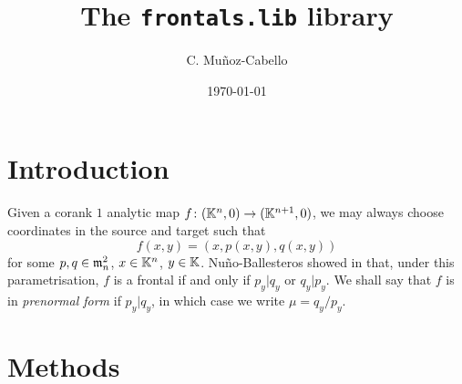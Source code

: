 \documentclass[
]{kaohandt}
\begin{document}

\title[The \texttt{frontals.lib} library]{The \texttt{frontals.lib} library}

\author[CMC]{C. Muñoz-Cabello}

\date{\today}


\maketitle

\margintoc

\begin{abstract}
\noindent
\end{abstract}


\medskip


\section{Introduction}

Given a corank $1$ analytic map $f\colon (\mathbb{K}^n,0) \to (\mathbb{K}^{n+1},0)$, we may always choose coordinates in the source and target such that
\begin{equation}\label{corank 1}
	f(x,y)=(x, p(x,y), q(x,y))
\end{equation}
for some $p,q \in \mathfrak{m}_n^2$, $x \in \mathbb{K}^n$, $y \in \mathbb{K}$.
Nuño-Ballesteros showed in  that, under this parametrisation, $f$ is a frontal if and only if $p_y | q_y$ or $q_y | p_y$.
We shall say that $f$ is in \emph{prenormal form} if $p_y|q_y$, in which case we write $\mu=q_y/p_y$.


\section{Methods}
\end{document}
